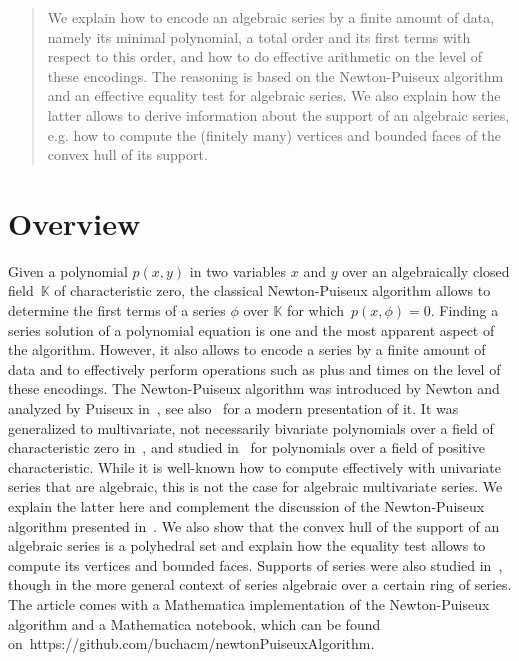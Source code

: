 \documentclass[a4paper,draft]{amsart}
\theoremstyle{definition}
\begin{document}
\begin{abstract}
We explain how to encode an algebraic series by a finite amount of data, namely its minimal polynomial, a total order and its first terms with respect to this order, and how to do effective arithmetic on the level of these encodings. The reasoning is based on the Newton-Puiseux algorithm and an effective equality test for algebraic series. We also explain how the latter allows to derive information about the support of an algebraic series, e.g. how to compute the (finitely many) vertices and bounded faces of the convex hull of its support. 
\end{abstract}

\section{Overview}

Given a polynomial $p(x,y)$ in two variables $x$ and $y$ over an algebraically closed field~$\mathbb{K}$ of characteristic zero, the classical Newton-Puiseux algorithm allows to determine the first terms of a series $\phi$ over $\mathbb{K}$ for which~$p(x,\phi) = 0$. Finding a series solution of a polynomial equation is one and the most apparent aspect of the algorithm. However, it also allows to encode a series by a finite amount of data and to effectively perform operations such as plus and times on the level of these encodings. The Newton-Puiseux algorithm was introduced by Newton and analyzed by Puiseux in~\cite{puiseux1850recherches}, see also~\cite{brieskorn2012plane} for a modern presentation of it. It was generalized to multivariate, not necessarily bivariate polynomials over a field of characteristic zero in~\cite{MacDonald}, and studied in~\cite{saavedra2017mcdonald} for polynomials over a field of positive characteristic. While it is well-known how to compute effectively with univariate series that are algebraic, this is not the case for algebraic multivariate series. We explain the latter here and complement the discussion of the Newton-Puiseux algorithm presented in~\cite{MacDonald}. 
We also show that the convex hull of the support of an algebraic series is a polyhedral set and explain how the equality test allows to compute its vertices and bounded faces. Supports of series were also studied in~\cite{aroca2019support,aroca2022minimal}, though in the more general context of series algebraic over a certain ring of series. The article comes with a Mathematica implementation of the Newton-Puiseux algorithm and a Mathematica notebook, which can be found on~https://github.com/buchacm/newtonPuiseuxAlgorithm.
\end{document}
